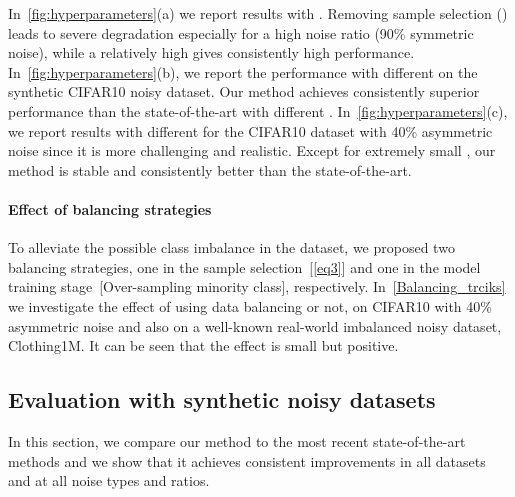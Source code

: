 \documentclass{bmvc2k}
\begin{document}
In~\cref{fig:hyperparameters}(a) we report results with . Removing sample selection () leads to severe degradation especially for a high noise ratio (90\% symmetric noise), while a relatively high  gives consistently high performance. In~\cref{fig:hyperparameters}(b), we report the performance with different  on the synthetic CIFAR10 noisy dataset. Our method achieves consistently superior performance than the state-of-the-art with different . In~\cref{fig:hyperparameters}(c), we report results with different  for the CIFAR10 dataset with 40\% asymmetric noise since it is more challenging and realistic. Except for extremely small , our method is stable and consistently better than the state-of-the-art.

\paragraph{Effect of balancing strategies}
\label{effect}
To alleviate the possible class imbalance in the dataset, we proposed two balancing strategies, one in the sample selection~[\cref{eq3}] and one in the model training stage~[Over-sampling minority class], respectively. In~\cref{Balancing_trciks} we investigate the effect of using data balancing or not, on CIFAR10 with 40\% asymmetric noise and also on a well-known real-world imbalanced noisy dataset, Clothing1M. It can be seen that the effect is small but positive.

\begin{table}[htbp]
\begin{center}
\end{center}
\caption{Effect of class balancing.}
\label{Balancing_trciks}
\end{table}


\subsection{Evaluation with synthetic noisy datasets}
\label{4-3}
In this section, we compare our method to the most recent state-of-the-art methods and we show that it achieves consistent improvements in all datasets and at all noise types and ratios.
\end{document}

